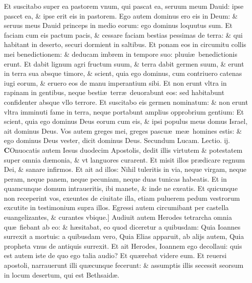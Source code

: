 \documentclass[a5paper,10pt]{book}
\def\leftmarginnote{%
	\lrmarginnote{\hskip -\marginparsep \hskip -6.5em}}
\def\ae{æ}
\begin{document}
\begin{multicols*}{2}
Et suscitabo super ea pastorem vnum, qui pascat ea, seruum meum Dauid: ipse pascet ea, \& ipse erit eis in pastorem.
Ego autem dominus ero eis in Deum: \& seruus meus Dauid princeps in medio eorum: ego dominus loquutus sum.
Et faciam cum eis pactum pacis, \& cessare faciam bestias pessimas de terra: \& qui habitant in deserto, securi dormient in saltibus.
Et ponam eos in circumitu collis mei benedictionem: \& deducam imbrem in tempore suo: pluui\ae \ benedictionis erunt.
Et dabit lignum agri fructum suum, \& terra dabit germen suum, \& erunt in terra sua absque timore, \& scient, quia ego dominus, cum contriuero catenas iugi eorum, \& eruero eos de manu imperantium sibi.
Et non erunt vltra in rapinam in gentibus, neque besti\ae \ terr\ae \ deuorabunt eos: sed habitabunt confidenter absque vllo terrore.
Et suscitabo eis germen nominatum: \& non erunt vltra imminuti fame in terra, neque portabunt amplius opprobrium gentium: Et scient, quia ego dominus Deus eorum cum eis, \& ipsi populus meus domus Israel, ait dominus Deus.
Vos autem greges mei, greges pascu\ae \ me\ae \ homines estis: \& ego dominus Deus vester, dicit dominus Deus.
\newline \color{red} Secundum Lucam. \hfill Lectio. ij. \color{black}
\vspace{-.25em}
\lettrine[lines=2]{\bfseries \color{red} C}{}\textdagger Onuocatis\leftmarginnote{\begin{flushright}c.9.a\end{flushright}} autem Iesus duodecim Apostolis, dedit illis virtutem \& potestatem super omnia d\ae monia, \& vt languores curarent.
Et misit illos pr\ae dicare regnum Dei, \& sanare infirmos.
Et ait ad illos: Nihil tuleritis in via, neque virgam, neque peram, neque panem, neque pecuniam, neque duas tunicas habeatis. 
Et in quamcunque domum intraueritis, ibi manete, \& inde ne exeatis.
Et quicunque non receperint vos, exeuntes de ciuitate illa, etiam puluerem pedum vestrorum excutite in testimonium supra illos.
Egressi autem circumibant per castella euangelizantes,
\& curantes vbique.]\leftmarginnote{\begin{flushright}B\end{flushright}}
\newline \indent Audiuit autem Herodes tetrarcha omnia qu\ae \ fiebant ab eo: \& h\ae sitabat, eo quod diceretur a quibusdam: Quia Ioannes surrexit a mortuis: a quibusdam vero, Quia Elias apparuit, ab alijs autem, Quia propheta vnus de antiquis surrexit.
Et ait Herodes, Ioannem ego decollaui: quis est autem iste de quo ego talia audio? Et qu\ae rebat videre eum. Et reuersi apostoli, narrauerunt illi qu\ae cunque fecerunt: \& assumptis illis secessit seorsum in locum desertum, qui est Bethsaid\ae .

\end{multicols*}
\end{document}
